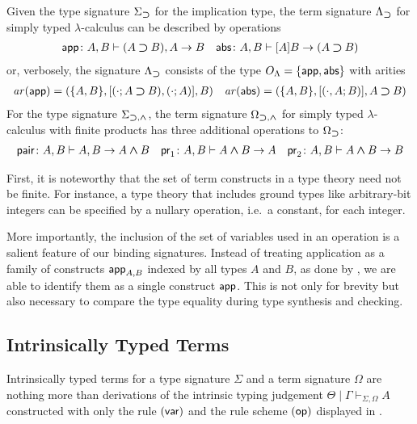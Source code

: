 \documentclass[acmsmall,screen]{acmart}
\theoremstyle{acmdefinition}
\begin{document}
\begin{example} \label{ex:STLC-sig}
  Given the type signature $\Sigma_{\mathbin{\bm{\supset}}}$ for the implication type, the term signature $\Lambda_{\mathbin{\bm{\supset}}}$ for simply typed $\lambda$-calculus can be described by operations
  \begin{align*}
    \mathsf{app}\colon A, B \vdash (A \mathbin{\bm{\supset}} B), A \to B && \mathsf{abs}\colon A , B \vdash [A]B \to (A \mathbin{\bm{\supset}} B)
  \end{align*}
    or, verbosely, the signature $\Lambda_{\mathbin{\bm{\supset}}}$ consists of the type $O_\Lambda = \{\mathsf{app}, \mathsf{abs}\}$ with arities
  \begin{align*}
    \mathit{ar}(\mathsf{app}) = (\{A, B\}, [(\cdot; A \mathbin{\bm{\supset}} B), (\cdot; A)], B)
    && 
    \mathit{ar}(\mathsf{abs}) = (\{A, B\}, [(\cdot, A; B)], A \mathbin{\bm{\supset}} B)
  \end{align*}
  For the type signature $\Sigma_{\mathbin{\bm{\supset}}, \mathbin{\bm{\wedge}}}$, the term signature $\Omega_{\mathbin{\bm{\supset}}, \mathbin{\bm{\wedge}}}$ for simply typed $\lambda$-calculus with finite products has three additional operations
to $\Omega_{\mathbin{\bm{\supset}}}$:
  \begin{align*}
    \mathsf{pair}\colon A, B \vdash A, B \to A \mathbin{\bm{\wedge}} B
    && \mathsf{pr}_{1} \colon A, B \vdash A \mathbin{\bm{\wedge}} B \to A
    && \mathsf{pr}_{2} \colon A, B \vdash A \mathbin{\bm{\wedge}} B \to B
  \end{align*}
\end{example}

First, it is noteworthy that the set of term constructs in a type theory need not be finite.
For instance, a type theory that includes ground types like arbitrary-bit integers can be specified by a nullary operation, i.e.\ a constant, for each integer.

More importantly, the inclusion of the set of variables used in an operation is a salient feature of our binding signatures.
Instead of treating application as a family of constructs $\mathsf{app}_{A, B}$ indexed by all types $A$ and $B$, as done by \citet{Fiore2022}, we are able to identify them as a single construct $\mathsf{app}$.
This is not only for brevity but also necessary to compare the type equality during type synthesis and checking.

\subsection{Intrinsically Typed Terms}

Intrinsically typed terms for a type signature $\Sigma$ and a term signature $\Omega$ are nothing more than derivations of the intrinsic typing judgement $\boxed{\Theta \mid \Gamma \vdash_{\Sigma, \Omega} A}$ constructed with only the rule $(\mathsf{var})$ and the rule scheme $(\mathsf{op})$ displayed in .
\end{document}
